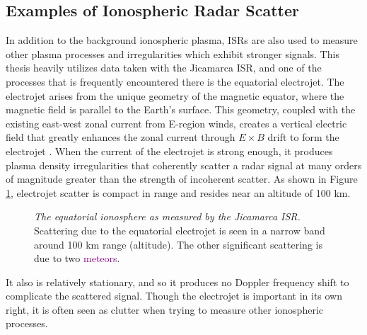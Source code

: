 \subsection{Examples of Ionospheric Radar Scatter}
\label{intro_radar_scatter_examples}
In addition to the background ionospheric plasma, ISRs are also used to measure other plasma processes and irregularities which exhibit stronger signals. This thesis heavily utilizes data taken with the Jicamarca ISR, and one of the processes that is frequently encountered there is the equatorial electrojet. The electrojet arises from the unique geometry of the magnetic equator, where the magnetic field is parallel to the Earth's surface. This geometry, coupled with the existing east-west zonal current from E-region winds, creates a vertical electric field that greatly enhances the zonal current through $E \times B$ drift to form the electrojet \autocite{Kel09}. When the current of the electrojet is strong enough, it produces plasma density irregularities that coherently scatter a radar signal at many orders of magnitude greater than the strength of incoherent scatter. As shown in Figure \ref{fig:electrojet_example}, electrojet scatter is compact in range and resides near an altitude of 100 km.
\begin{figure}[tbp]
 \centering
 \caption[The equatorial ionosphere as measured by the Jicamarca ISR]{\emph{The equatorial ionosphere as measured by the Jicamarca ISR.} Scattering due to the \textcolor{green!80!black}{equatorial electrojet} is seen in a narrow band around 100 km range (altitude). The other significant scattering is due to two \textcolor{purple}{meteors}.}
 \label{fig:electrojet_example}
\end{figure}%
It also is relatively stationary, and so it produces no Doppler frequency shift to complicate the scattered signal. Though the electrojet is important in its own right, it is often seen as clutter when trying to measure other ionospheric processes.

